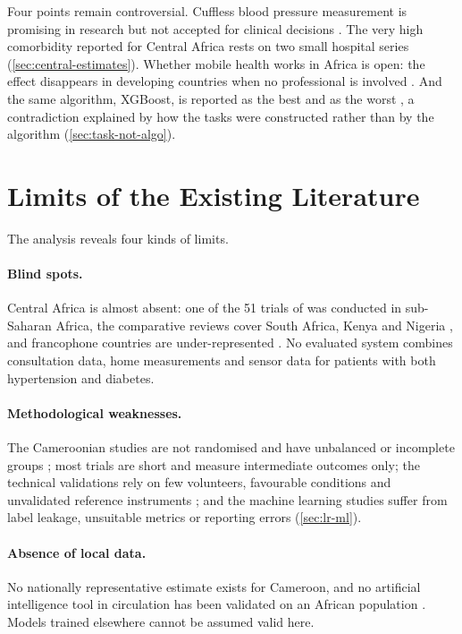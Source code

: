 Four points remain controversial. Cuffless blood pressure measurement is promising in research \parencite{liu2025ppg} but not accepted for clinical decisions \parencite{who2023hypertension}. The very high comorbidity reported for Central Africa rests on two small hospital series (\cref{sec:central-estimates}). Whether mobile health works in Africa is open: the effect disappears in developing countries when no professional is involved \parencite{mao2020}. And the same algorithm, XGBoost, is reported as the best \parencite{efendi2025} and as the worst \parencite{mendoza2025}, a contradiction explained by how the tasks were constructed rather than by the algorithm (\cref{sec:task-not-algo}).

\section{Limits of the Existing Literature}\label{sec:lit-gaps}\label{sec:positioning}

The analysis reveals four kinds of limits.

\paragraph{Blind spots.} Central Africa is almost absent: one of the 51 trials of \textcite{mao2020} was conducted in sub-Saharan Africa, the comparative reviews cover South Africa, Kenya and Nigeria \parencite{agbeyangi2025}, and francophone countries are under-represented \parencite{dodoo2022}. No evaluated system combines consultation data, home measurements and sensor data for patients with both hypertension and diabetes.

\paragraph{Methodological weaknesses.} The Cameroonian studies are not randomised and have unbalanced or incomplete groups \parencite{kingue2013,bediang2021}; most trials are short and measure intermediate outcomes only; the technical validations rely on few volunteers, favourable conditions and unvalidated reference instruments \parencite{efendi2025}; and the machine learning studies suffer from label leakage, unsuitable metrics or reporting errors (\cref{sec:lr-ml}).

\paragraph{Absence of local data.} No nationally representative estimate exists for Cameroon, and no artificial intelligence tool in circulation has been validated on an African population \parencite{segun2025}. Models trained elsewhere cannot be assumed valid here.

